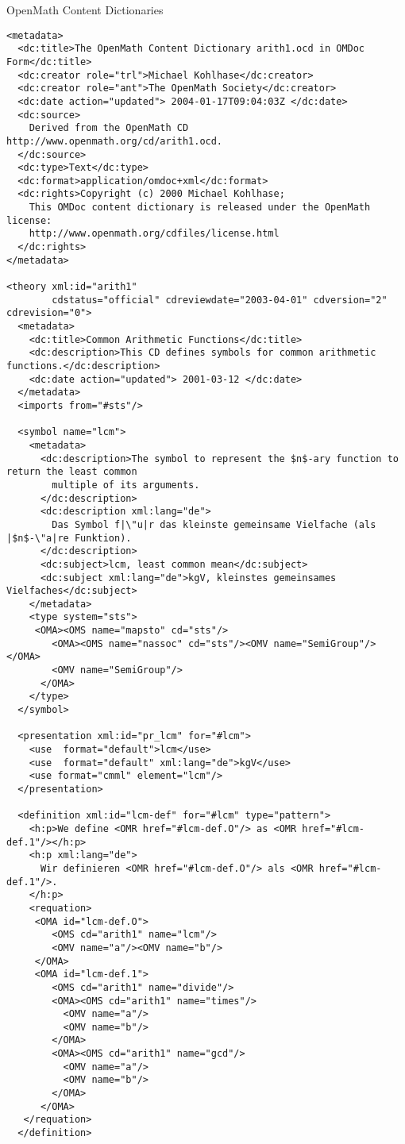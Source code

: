 \begin{omgroup}[id=omcds]{OpenMath Content Dictionaries}
\begin{lstlisting}
<metadata>
  <dc:title>The OpenMath Content Dictionary arith1.ocd in OMDoc Form</dc:title>
  <dc:creator role="trl">Michael Kohlhase</dc:creator>
  <dc:creator role="ant">The OpenMath Society</dc:creator>
  <dc:date action="updated"> 2004-01-17T09:04:03Z </dc:date>
  <dc:source>
    Derived from the OpenMath CD http://www.openmath.org/cd/arith1.ocd.
  </dc:source>
  <dc:type>Text</dc:type>
  <dc:format>application/omdoc+xml</dc:format>
  <dc:rights>Copyright (c) 2000 Michael Kohlhase;
    This OMDoc content dictionary is released under the OpenMath license:
    http://www.openmath.org/cdfiles/license.html
  </dc:rights>
</metadata>

<theory xml:id="arith1"
        cdstatus="official" cdreviewdate="2003-04-01" cdversion="2" cdrevision="0">
  <metadata>
    <dc:title>Common Arithmetic Functions</dc:title>
    <dc:description>This CD defines symbols for common arithmetic functions.</dc:description>
    <dc:date action="updated"> 2001-03-12 </dc:date>
  </metadata>
  <imports from="#sts"/>

  <symbol name="lcm">
    <metadata>
      <dc:description>The symbol to represent the $n$-ary function to return the least common
        multiple of its arguments.
      </dc:description>
      <dc:description xml:lang="de"> 
        Das Symbol f|\"u|r das kleinste gemeinsame Vielfache (als |$n$-\"a|re Funktion).
      </dc:description>
      <dc:subject>lcm, least common mean</dc:subject>
      <dc:subject xml:lang="de">kgV, kleinstes gemeinsames Vielfaches</dc:subject>
    </metadata>
    <type system="sts">
     <OMA><OMS name="mapsto" cd="sts"/>
        <OMA><OMS name="nassoc" cd="sts"/><OMV name="SemiGroup"/></OMA>
        <OMV name="SemiGroup"/>
      </OMA>
    </type>
  </symbol>

  <presentation xml:id="pr_lcm" for="#lcm">
    <use  format="default">lcm</use>
    <use  format="default" xml:lang="de">kgV</use>
    <use format="cmml" element="lcm"/>
  </presentation>

  <definition xml:id="lcm-def" for="#lcm" type="pattern">
    <h:p>We define <OMR href="#lcm-def.O"/> as <OMR href="#lcm-def.1"/></h:p>
    <h:p xml:lang="de">
      Wir definieren <OMR href="#lcm-def.O"/> als <OMR href="#lcm-def.1"/>.
    </h:p>
    <requation>
     <OMA id="lcm-def.O">
        <OMS cd="arith1" name="lcm"/>
        <OMV name="a"/><OMV name="b"/>
     </OMA>
     <OMA id="lcm-def.1">
        <OMS cd="arith1" name="divide"/>
        <OMA><OMS cd="arith1" name="times"/>
          <OMV name="a"/>
          <OMV name="b"/>
        </OMA>
        <OMA><OMS cd="arith1" name="gcd"/>
          <OMV name="a"/>
          <OMV name="b"/>
        </OMA>
      </OMA>
   </requation>
  </definition>


\end{lstlisting}
\end{omgroup}
